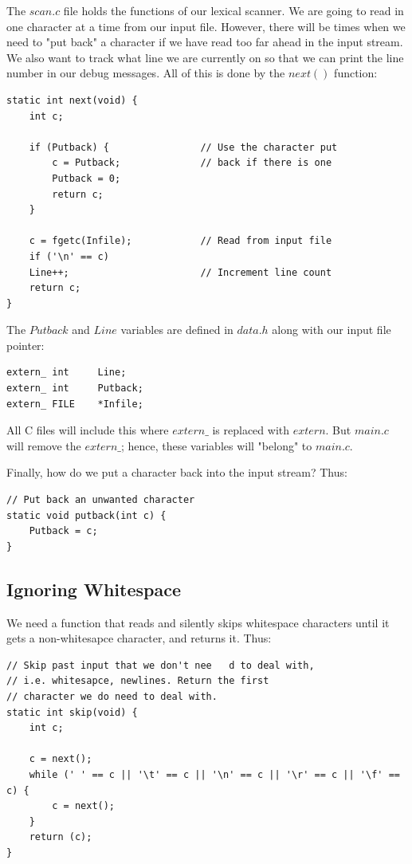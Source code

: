 \documentclass[a4paper,12pt]{article}
\begin{document}
The $scan.c$ file holds the functions of our lexical scanner. We are going to read in one character at a time from our input file. However, there will be times when we need to "put back" a character if we have read too far ahead in the input stream. We also want to track what line we are currently on so that we can print the line number in our debug messages. All of this is done by the $next()$ function:

\begin{lstlisting}
static int next(void) {
    int c;
  
    if (Putback) {                // Use the character put
        c = Putback;              // back if there is one
        Putback = 0;
        return c;
    }
        
    c = fgetc(Infile);            // Read from input file
    if ('\n' == c)
    Line++;                       // Increment line count
    return c;
}
\end{lstlisting}

The $Putback$ and $Line$ variables are defined in $data.h$ along with our input file pointer:

\begin{lstlisting}
extern_ int     Line;
extern_ int     Putback;
extern_ FILE    *Infile;
\end{lstlisting}

All C files will include this where $extern\_$ is replaced with $extern$. But $main.c$ will remove the $extern\_$; hence, these variables will "belong" to $main.c$.

Finally, how do we put a character back into the input stream? Thus:

\begin{lstlisting}
// Put back an unwanted character
static void putback(int c) {
    Putback = c;
}
\end{lstlisting}

\subsection{Ignoring Whitespace}

We need a function that reads and silently skips whitespace characters until it gets a non-whitesapce character, and returns it. Thus:

\begin{lstlisting}
// Skip past input that we don't nee   d to deal with,
// i.e. whitesapce, newlines. Return the first
// character we do need to deal with.
static int skip(void) {
    int c;

    c = next();
    while (' ' == c || '\t' == c || '\n' == c || '\r' == c || '\f' == c) {
        c = next();
    }
    return (c);
}
\end{lstlisting}
\end{document}
